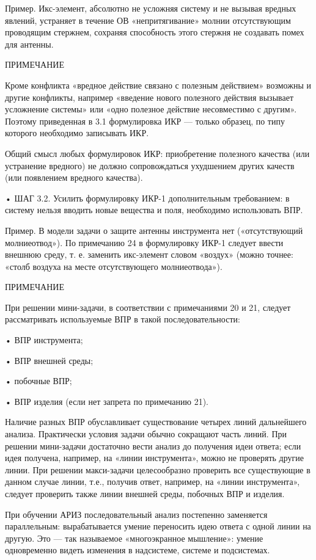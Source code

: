 Пример.  Икс-элемент,  абсолютно  не  усложняя систему  и  не  вызывая
вредных  явлений,  устраняет  в  течение  ОВ  «непритягивание»  молнии
отсутствующим проводящим стержнем,  сохраняя способность этого стержня
не создавать помех для антенны.

ПРИМЕЧАНИЕ

Кроме  конфликта  «вредное  действие  связано  с  полезным  действием»
возможны  и  другие  конфликты, например  «введение  нового  полезного
действия  вызывает усложнение  системы»  или  «одно полезное  действие
несовместимо с другим».  Поэтому приведенная в 3.1  формулировка ИКР —
только образец, по типу которого необходимо записывать ИКР.

Общий смысл  любых формулировок  ИКР: приобретение  полезного качества
(или устранение  вредного) не должно сопровождаться  ухудшением других
качеств (или появлением вредного качества).


• ШАГ  3.2. Усилить  формулировку ИКР-1 дополнительным  требованием: в
систему нельзя вводить новые  вещества и поля, необходимо использовать
ВПР.

Пример.   В   модели  задачи   о   защите   антенны  инструмента   нет
(«отсутствующий молниеотвод»).  По примечанию 24 в  формулировку ИКР-1
следует  ввести  внешнюю  среду,  т. е.  заменить  икс-элемент  словом
«воздух»  (можно  точнее:  «столб   воздуха  на  месте  отсутствующего
молниеотвода»).

ПРИМЕЧАНИЕ

При  решении  мини-задачи, в  соответствии  с  примечаниями 20  и  21,
следует рассматривать используемые ВПР в такой последовательности:

• ВПР инструмента;

• ВПР внешней среды;

• побочные ВПР;

• ВПР изделия (если нет запрета по примечанию 21).


Наличие   разных  ВПР   обуславливает   существование  четырех   линий
дальнейшего анализа. Практически условия задачи обычно сокращают часть
линий. При  решении мини-задачи  достаточно вести анализ  до получения
идеи  ответа; если  идея получена,  например, на  «линии инструмента»,
можно   не   проверять   другие  линии.   При   решении   макси-задачи
целесообразно проверить все существующие  в данном случае линии, т.е.,
получив  ответ, например,  на «линии  инструмента», следует  проверить
также линии внешней среды, побочных ВПР и изделия.

При  обучении  АРИЗ   последовательный  анализ  постепенно  заменяется
параллельным:  вырабатывается умение  переносить идею  ответа с  одной
линии на другую. Это — так называемое «многоэкранное мышление»: умение
одновременно видеть изменения в надсистеме, системе и подсистемах.

